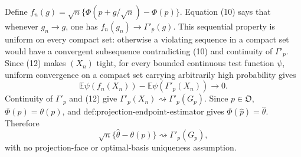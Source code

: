 Define \(f_n(g)=\sqrt n\{\Phi(p+g/\sqrt n)-\Phi(p)\}\).  Equation (10) says that whenever \(g_n\to g\), one has \(f_n(g_n)\to\Gamma'_p(g)\).  This sequential property is uniform on every compact set: otherwise a violating sequence in a compact set would have a convergent subsequence contradicting (10) and continuity of \(\Gamma'_p\).  Since (12) makes \((X_n)\) tight, for every bounded continuous test function \(\psi\), uniform convergence on a compact set carrying arbitrarily high probability gives
\[
\mathbb E\psi(f_n(X_n))-\mathbb E\psi(\Gamma'_p(X_n))\longrightarrow0.
\]
Continuity of \(\Gamma'_p\) and (12) give \(\Gamma'_p(X_n)\rightsquigarrow\Gamma'_p(G_p)\).  Since \(p\in\mathfrak O\), \(\Phi(p)=\theta(p)\), and \(\text{def:projection-endpoint-estimator}\) gives \(\Phi(\widehat p)=\widehat\theta\).  Therefore
\[
\sqrt n\{\widehat\theta-\theta(p)\}
\rightsquigarrow\Gamma'_p(G_p),
\]
with no projection-face or optimal-basis uniqueness assumption.